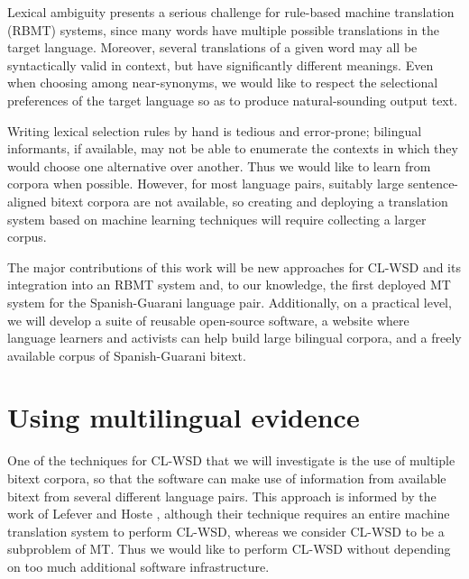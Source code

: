 \documentclass{article}
\begin{document}
Lexical ambiguity presents a serious challenge for rule-based machine
translation (RBMT) systems, since many words have multiple possible
translations in the target language. Moreover, several translations of a given
word may all be syntactically valid in context, but have significantly
different meanings. Even when choosing among near-synonyms, we would like to
respect the selectional preferences of the target language so as to produce
natural-sounding output text.

Writing lexical selection rules by hand is tedious and error-prone; bilingual
informants, if available, may not be able to enumerate the contexts in which
they would choose one alternative over another. Thus we would like to learn
from corpora when possible. However, for most language pairs, suitably large
sentence-aligned bitext corpora are not available, so creating and deploying a
translation system based on machine learning techniques will require collecting
a larger corpus.


The major contributions of this work will be new approaches for CL-WSD
and its integration into an RBMT system and, to our knowledge, the first
deployed MT system for the Spanish-Guarani language pair. Additionally, on a
practical level, we will develop a suite of reusable open-source
software, a website where language learners and activists can help build large
bilingual corpora, and a freely available corpus of Spanish-Guarani bitext.

\section{Using multilingual evidence}
One of the techniques for CL-WSD that we will investigate is the use of
multiple bitext corpora, so that the software can make use of information from
available bitext from several different language pairs. This approach is
informed by the work of Lefever and Hoste
\cite{lefever-hoste-decock:2011:ACL-HLT2011}, although their technique requires
an entire machine translation system to perform CL-WSD, whereas we consider
CL-WSD to be a subproblem of MT. Thus we would like to perform CL-WSD without
depending on too much additional software infrastructure.
\end{document}

